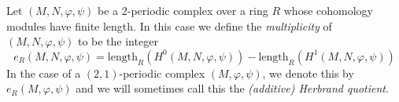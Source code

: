 \begin{definition}
\label{definition-periodic-length}
Let $(M, N, \varphi, \psi)$ be a $2$-periodic complex
over a ring $R$ whose cohomology modules have finite length.
In this case we define the {\it multiplicity} of $(M, N, \varphi, \psi)$
to be the integer
$$
e_R(M, N, \varphi, \psi) =
\text{length}_R(H^0(M, N, \varphi, \psi))
-
\text{length}_R(H^1(M, N, \varphi, \psi))
$$
In the case of a $(2, 1)$-periodic complex $(M, \varphi, \psi)$,
we denote this by $e_R(M, \varphi, \psi)$ and we will sometimes call this
the {\it (additive) Herbrand quotient}.
\end{definition}